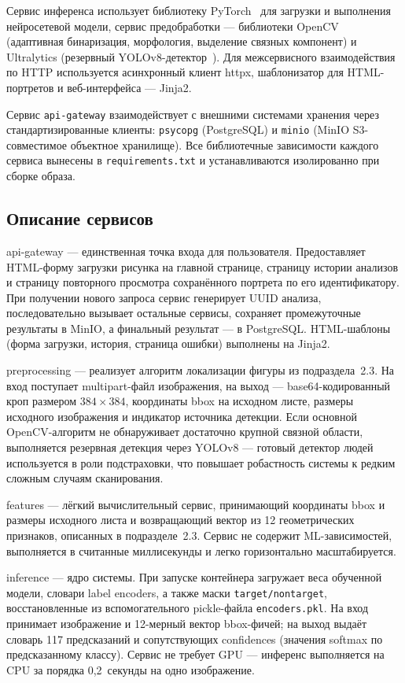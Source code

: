 Сервис инференса использует библиотеку PyTorch~\cite{pytorch} для загрузки и выполнения нейросетевой модели, сервис предобработки --- библиотеки OpenCV~\cite{opencv} (адаптивная бинаризация, морфология, выделение связных компонент) и Ultralytics (резервный YOLOv8-детектор~\cite{yolov8}). Для межсервисного взаимодействия по HTTP используется асинхронный клиент httpx, шаблонизатор для HTML-портретов и веб-интерфейса --- Jinja2.

Сервис \texttt{api-gateway} взаимодействует с внешними системами хранения через стандартизированные клиенты: \texttt{psycopg} (PostgreSQL) и \texttt{minio} (MinIO S3-совместимое объектное хранилище). Все библиотечные зависимости каждого сервиса вынесены в \texttt{requirements.txt} и устанавливаются изолированно при сборке образа.

\subsection{Описание сервисов}

api-gateway --- единственная точка входа для пользователя. Предоставляет HTML-форму загрузки рисунка на главной странице, страницу истории анализов и страницу повторного просмотра сохранённого портрета по его идентификатору. При получении нового запроса сервис генерирует UUID анализа, последовательно вызывает остальные сервисы, сохраняет промежуточные результаты в MinIO, а финальный результат --- в PostgreSQL. HTML-шаблоны (форма загрузки, история, страница ошибки) выполнены на Jinja2.

preprocessing --- реализует алгоритм локализации фигуры из подраздела~2.3. На вход поступает multipart-файл изображения, на выход --- base64-кодированный кроп размером $384 \times 384$, координаты bbox на исходном листе, размеры исходного изображения и индикатор источника детекции. Если основной OpenCV-алгоритм не обнаруживает достаточно крупной связной области, выполняется резервная детекция через YOLOv8 --- готовый детектор людей используется в роли подстраховки, что повышает робастность системы к редким сложным случаям сканирования.

features --- лёгкий вычислительный сервис, принимающий координаты bbox и размеры исходного листа и возвращающий вектор из 12 геометрических признаков, описанных в подразделе~2.3. Сервис не содержит ML-зависимостей, выполняется в считанные миллисекунды и легко горизонтально масштабируется.

inference --- ядро системы. При запуске контейнера загружает веса обученной модели, словари label encoders, а также маски \texttt{target/nontarget}, восстановленные из вспомогательного pickle-файла \texttt{encoders.pkl}. На вход принимает изображение и 12-мерный вектор bbox-фичей; на выход выдаёт словарь 117 предсказаний и сопутствующих confidences (значения softmax по предсказанному классу). Сервис не требует GPU --- инференс выполняется на CPU за порядка 0,2~секунды на одно изображение.

